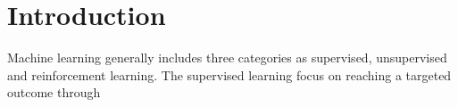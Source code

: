\section{Introduction}

Machine learning generally includes three categories as supervised, unsupervised and reinforcement learning. The supervised learning focus on reaching a targeted outcome through 
